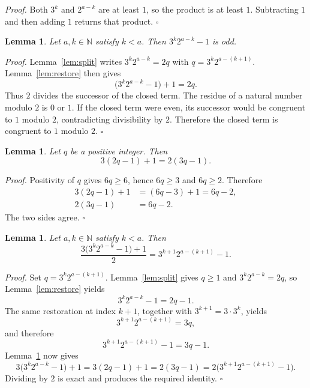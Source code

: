 \documentclass[11pt,letterpaper]{article}
\newcommand{\N}{\mathbb{N}}
\newtheorem{lemma}[theorem]{Lemma}
\newenvironment{proof}{\noindent\textit{Proof.}}{\hfill\(\square\)}
\begin{document}
\begin{proof}
Both \(3^{k}\) and \(2^{a-k}\) are at least \(1\), so the product is at least \(1\). Subtracting \(1\) and then adding \(1\) returns that product.
\end{proof}

\begin{lemma}
\label{lem:odd}
Let \(a,k\in\N\) satisfy \(k<a\). Then \(3^{k}2^{a-k}-1\) is odd.
\end{lemma}

\begin{proof}
Lemma~\ref{lem:split} writes \(3^{k}2^{a-k}=2q\) with \(q=3^{k}2^{a-(k+1)}\). Lemma~\ref{lem:restore} then gives
\[
\bigl(3^{k}2^{a-k}-1\bigr)+1=2q.
\]
Thus \(2\) divides the successor of the closed term. The residue of a natural number modulo \(2\) is \(0\) or \(1\). If the closed term were even, its successor would be congruent to \(1\) modulo \(2\), contradicting divisibility by \(2\). Therefore the closed term is congruent to \(1\) modulo \(2\).
\end{proof}

\begin{lemma}
\label{lem:numerator}
Let \(q\) be a positive integer. Then
\[
3(2q-1)+1=2(3q-1).
\]
\end{lemma}

\begin{proof}
Positivity of \(q\) gives \(6q\ge 6\), hence \(6q\ge 3\) and \(6q\ge 2\). Therefore
\begin{align*}
3(2q-1)+1&=(6q-3)+1=6q-2,\\
2(3q-1)&=6q-2.
\end{align*}
The two sides agree.
\end{proof}

\begin{lemma}
\label{lem:step}
Let \(a,k\in\N\) satisfy \(k<a\). Then
\[
\frac{3\bigl(3^{k}2^{a-k}-1\bigr)+1}{2}=3^{k+1}2^{a-(k+1)}-1.
\]
\end{lemma}

\begin{proof}
Set \(q=3^{k}2^{a-(k+1)}\). Lemma~\ref{lem:split} gives \(q\ge 1\) and \(3^{k}2^{a-k}=2q\), so Lemma~\ref{lem:restore} yields
\[
3^{k}2^{a-k}-1=2q-1.
\]
The same restoration at index \(k+1\), together with \(3^{k+1}=3\cdot 3^{k}\), yields
\[
3^{k+1}2^{a-(k+1)}=3q,
\]
and therefore
\[
3^{k+1}2^{a-(k+1)}-1=3q-1.
\]
Lemma~\ref{lem:numerator} now gives
\[
3\bigl(3^{k}2^{a-k}-1\bigr)+1=3(2q-1)+1=2(3q-1)=2\bigl(3^{k+1}2^{a-(k+1)}-1\bigr).
\]
Dividing by \(2\) is exact and produces the required identity.
\end{proof}
\end{document}
